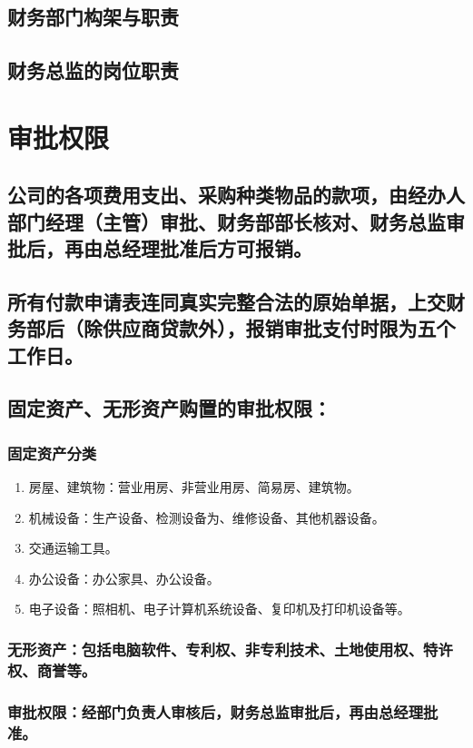 \documentclass{ctexart}
\begin{document}
\subsection{财务部门构架与职责}
\label{sec-1-5}
\subsection{财务总监的岗位职责}
\label{sec-1-6}
\section{审批权限}
\label{sec-2}
\subsection{公司的各项费用支出、采购种类物品的款项，由经办人部门经理（主管）审批、财务部部长核对、财务总监审批后，再由总经理批准后方可报销。}
\label{sec-2-1}
\subsection{所有付款申请表连同真实完整合法的原始单据，上交财务部后（除供应商贷款外），报销审批支付时限为五个工作日。}
\label{sec-2-2}
\subsection{固定资产、无形资产购置的审批权限：}
\label{sec-2-3}
\subsubsection{固定资产分类}
\label{sec-2-3-1}
\begin{enumerate}
\item 房屋、建筑物：营业用房、非营业用房、简易房、建筑物。
\label{sec-2-3-1-1}
\item 机械设备：生产设备、检测设备为、维修设备、其他机器设备。
\label{sec-2-3-1-2}
\item 交通运输工具。
\label{sec-2-3-1-3}
\item 办公设备：办公家具、办公设备。
\label{sec-2-3-1-4}
\item 电子设备：照相机、电子计算机系统设备、复印机及打印机设备等。
\label{sec-2-3-1-5}
\end{enumerate}
\subsubsection{无形资产：包括电脑软件、专利权、非专利技术、土地使用权、特许权、商誉等。}
\label{sec-2-3-2}
\subsubsection{审批权限：经部门负责人审核后，财务总监审批后，再由总经理批准。}
\label{sec-2-3-3}
\end{document}
